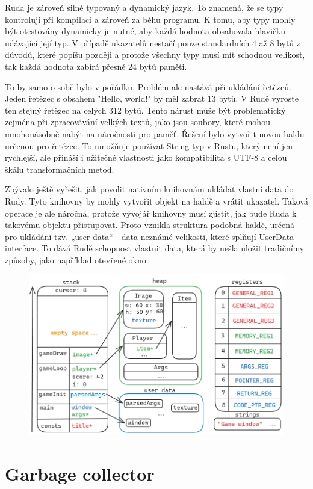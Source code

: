 \documentclass[12pt, a4paper,
twoside,        %
openright
]{report}
\begin{document}
	Ruda je zároveň silně typovaný a dynamický jazyk. To znamená, že se typy kontrolují při kompilaci a zároveň za běhu programu. K tomu, aby typy mohly být otestovány dynamicky je nutné, aby každá hodnota obsahovala hlavičku udávající její typ. V případě ukazatelů nestačí pouze standardních 4 až 8 bytů z důvodů, které popíšu později a protože všechny typy musí mít schodnou velikost, tak každá hodnota zabírá přesně 24 bytů paměti.
	
	To by samo o sobě bylo v pořádku. Problém ale nastává při ukládání řetězců. Jeden řetězec s obsahem "Hello, world!" by měl zabrat 13 bytů. V Rudě vyroste ten stejný řetězec na celých 312 bytů. Tento nárust může být problematický zejména při zpracovávání velkých textů, jako jsou soubory, které mohou mnohonásobně nabýt na náročnosti pro paměť. Řešení bylo vytvořit novou haldu určenou pro řetězce. To umožňuje používat String typ v Rustu, který není jen rychlejší, ale přináší i užitečné vlastnosti jako kompatibilita s UTF-8 a celou škálu transformačních metod.
	
	Zbývalo ještě vyřešit, jak povolit nativním knihovnám ukládat vlastní data do Rudy. Tyto knihovny by mohly vytvořit objekt na haldě a vrátit ukazatel. Taková operace je ale náročná, protože vývojář knihovny musí zjistit, jak bude Ruda k takovému objektu přistupovat. Proto vznikla struktura podobná haldě, určená pro ukládání tzv. „user data“ - data neznámé velikosti, které splňují UserData interface. To dává Rudě schopnost vlastnit data, která by nešla uložit tradičnímy způsoby, jako například otevřené okno.
	
	\begin{figure}[h]
		\centering
		\includegraphics[width=0.8\linewidth]{image/memory.png}
	\end{figure}
	
	\section{Garbage collector}
	
\end{document}
